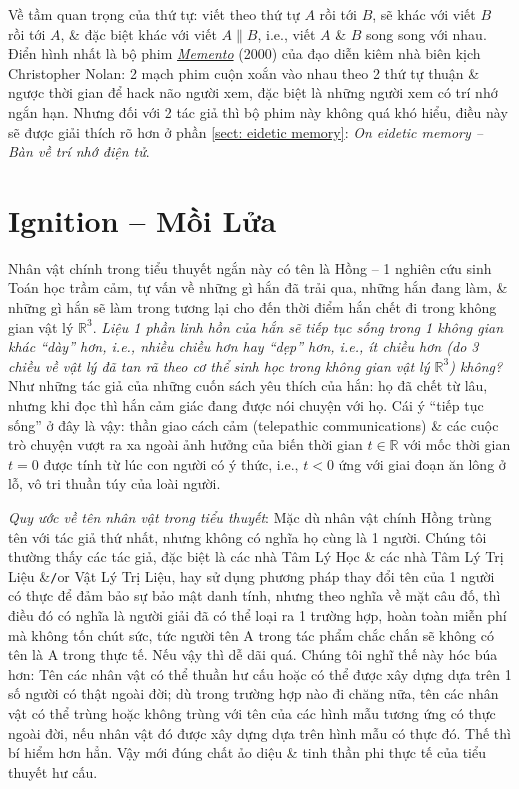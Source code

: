 \documentclass[12pt,oneside]{book}
\begin{document}
Về tầm quan trọng của thứ tự: viết theo thứ tự $A$ rồi tới $B$, sẽ khác với viết $B$ rồi tới $A$, \& đặc biệt khác với viết $A\parallel B$, i.e., viết $A$ \& $B$ song song với nhau. Điển hình nhất là bộ phim \href{https://www.imdb.com/title/tt0209144/}{\it Memento} (2000) của đạo diễn kiêm nhà biên kịch {\sc Christopher Nolan}: 2 mạch phim cuộn xoắn vào nhau theo 2 thứ tự thuận \& ngược thời gian để hack não người xem, đặc biệt là những người xem có trí nhớ ngắn hạn. Nhưng đối với 2 tác giả thì bộ phim này không quá khó hiểu, điều này sẽ được giải thích rõ hơn ở phần \ref{sect: eidetic memory}: {\it On eidetic memory -- Bàn về trí nhớ điện tử}.

\chapter{Ignition -- Mồi Lửa}
\minitoc
Nhân vật chính trong tiểu thuyết ngắn này có tên là {\sf Hồng} -- 1 nghiên cứu sinh Toán học trầm cảm, tự vấn về những gì hắn đã trải qua, những hắn đang làm, \& những gì hắn sẽ làm trong tương lại cho đến thời điểm hắn chết đi trong không gian vật lý $\mathbb{R}^3$. {\it Liệu 1 phần linh hồn của hắn sẽ tiếp tục sống trong 1 không gian khác ``dày'' hơn, i.e., nhiều chiều hơn hay ``dẹp'' hơn, i.e., ít chiều hơn (do 3 chiều về vật lý đã tan rã theo cơ thể sinh học trong không gian vật lý $\mathbb{R}^3$) không?} Như những tác giả của những cuốn sách yêu thích của hắn: họ đã chết từ lâu, nhưng khi đọc thì hắn cảm giác đang được nói chuyện với họ. Cái ý ``tiếp tục sống'' ở đây là vậy: thần giao cách cảm (telepathic communications) \& các cuộc trò chuyện vượt ra xa ngoài ảnh hưởng của biến thời gian $t\in\mathbb{R}$ với mốc thời gian $t = 0$ được tính từ lúc con người có ý thức, i.e., $t < 0$ ứng với giai đoạn ăn lông ở lỗ, vô tri thuần túy của loài người.

{\it Quy ước về tên nhân vật trong tiểu thuyết}: Mặc dù nhân vật chính {\sf Hồng} trùng tên với tác giả thứ nhất, nhưng không có nghĩa họ cùng là 1 người. Chúng tôi thường thấy các tác giả, đặc biệt là các nhà Tâm Lý Học \& các nhà Tâm Lý Trị Liệu \&{\tt/}or Vật Lý Trị Liệu, hay sử dụng phương pháp thay đổi tên của 1 người có thực để đảm bảo sự bảo mật danh tính, nhưng theo nghĩa về mặt câu đố, thì điều đó có nghĩa là người giải đã có thể loại ra 1 trường hợp, hoàn toàn miễn phí mà không tốn chút sức, tức người tên {\sf A} trong tác phẩm chắc chắn sẽ không có tên là {\sf A} trong thực tế. Nếu vậy thì dễ dãi quá. Chúng tôi nghĩ thế này hóc búa hơn: Tên các nhân vật có thể thuần hư cấu hoặc có thể được xây dựng dựa trên 1 số người có thật ngoài đời; dù trong trường hợp nào đi chăng nữa, tên các nhân vật có thể trùng hoặc không trùng với tên của các hình mẫu tương ứng có thực ngoài đời, nếu nhân vật đó được xây dựng dựa trên hình mẫu có thực đó. Thế thì bí hiểm hơn hẳn. Vậy mới đúng chất ảo diệu \& tinh thần phi thực tế của tiểu thuyết hư cấu.
\end{document}
